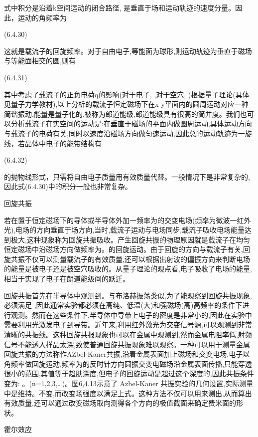 式中积分是沿着k空间运动的闭合路径, 是垂直于场和运动轨迹的速度分量。因此，运动的角频率为

 	(6.4.30)

这就是载流子的回旋频率。对于自由电子,等能面为球形,则运动轨迹为垂直于磁场与等能面相交的圆,则有

 	(6.4.31)

其中考虑了载流子的正负电荷q的影响(对于电子, ,对于空穴, )根据量子理论(具体见量子力学教材),以上分析的载流子恒定磁场下在x-y平面内的圆周运动对应一种简谐振动,能量是量子化的,被称为郎道能级,郎道能级具有很高的简并度。我们也可以分析载流子在实空间的运动是:在垂直于磁场的平面内做圆周运动,具体运动方向与载流子的电荷有关,同时以速度沿磁场方向做匀速运动,因此总的运动轨迹为一旋线，若品体中电子的能带结构有

 	(6.4.32)

的抛物线形式，只需将自由电子质量用有效质量代替。一般情况下是非常复杂的,因此式(6.4.30)中的积分一般也非常复杂。





回旋共振

若在置于恒定磁场下的导体或半导体外加一频率为的交变电场(频率为微波一红外光),电场的方向垂直于场方向,当时,载流子运动与电场同步,载流子吸收电场能量达到极大,这种现象称为回旋共振吸收。产生回旋共振的物理原因就是载流子在均匀恒定磁场中沿磁场方向做频率为。的回旋运动。由于回旋的方向与载流子有关,回旋共振不仅可以测量载流子的有效质量,还可以根据出射波的偏振方向来判断电场的能量是被电子还是被空穴吸收的。从量子理论的观点看,电子吸收了电场的能量,相当于实现了电子在朗道能级间的跃迁。

回旋共振首先在半导体中观测到。与布洛赫振荡类似,为了能观察到回旋共振现象,必须满足 ,因此通常实验都必须在高纯、低温(大)和强磁场(高)高频率的条件下进行观测。然而在这些条件下,半导体中导带上电子的密度是非常小的,因此在实验中需要利用光激发电子到导带。近年来,利用红外激光为交变信号源,可以观测到非常清晰的共振线。这种回旋共报现象也可以在金属中观测到,然而金属电阻率低,射频信号不能透入样品太深,致使普通回旋共振现象难以观察。一种可以用于测量金属回旋共振的方法称作AZbel-Kancr共振,沿着金属表面加上磁场和交变电场,电子以角频率做回旋运动,频率为的反时针方向圆振交变电磁场沿金属表面传播,只能穿透很小的范围,其值等于趋肤深度,但电子的回旋运动是超过这个深度的,因此共振条件变为: 。(n=1,2,3,…)。图6,4.13示意了 Azbel-Kaner 共振实验的几何设置,实际测量中是维持。不变,而改变场强度以满足上式。这种方法不仅可以用来测出,从而算出有效质量,还可以通过改变磁场取向测得各个方向的极值截面来确定费米面的形状。



霍尔效应

